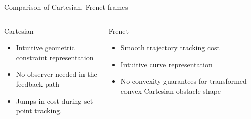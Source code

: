 \documentclass[10pt,aspectratio=1610]{beamer} %
\begin{document}
\begin{frame}{Comparison of Cartesian, Frenet frames}
	\begin{columns}[onlytextwidth]
		\begin{column}{0.5\textwidth}
				Cartesian
				\begin{itemize}[label=\textbullet]
					\item Intuitive geometric constraint representation
					\item No observer needed in the feedback path
					\item Jumps in cost during set point tracking. 
				\end{itemize}
		\end{column}
		\begin{column}{0.5\textwidth}
				Frenet
				\begin{itemize}[label=\textbullet]
					\item Smooth trajectory tracking cost
					\item Intuitive curve representation
					\item No convexity guarantees for transformed convex Cartesian obstacle shape
				\end{itemize}
		\end{column}
	\end{columns}
\end{frame}
\end{document}
